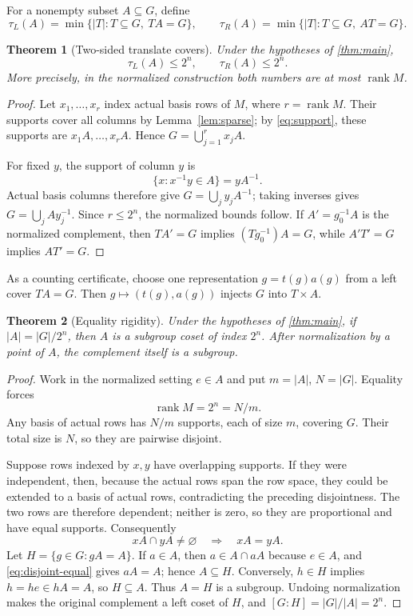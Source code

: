 \documentclass[11pt,a4paper]{amsart}
\newtheorem{theorem}{Theorem}[section]
\theoremstyle{definition}
\theoremstyle{remark}
\newcommand{\rank}{\operatorname{rank}}
\begin{document}
For a nonempty subset $A\subseteq G$, define
\[
 \tau_L(A)=\min\{|T|:T\subseteq G,\ TA=G\},\qquad
 \tau_R(A)=\min\{|T|:T\subseteq G,\ AT=G\}.
\]

\begin{theorem}[Two-sided translate covers]\label{thm:translate}
Under the hypotheses of \cref{thm:main},
\[
  \tau_L(A)\le2^n,\qquad \tau_R(A)\le2^n.
\]
More precisely, in the normalized construction both numbers are at most
$\rank M$.
\end{theorem}

\begin{proof}
Let $x_1,\ldots,x_r$ index actual basis rows of $M$, where $r=\rank M$.
Their supports cover all columns by Lemma~\ref{lem:sparse}; by
\cref{eq:support}, these supports are $x_1A,\ldots,x_rA$.  Hence
$G=\bigcup_{j=1}^r x_jA$.

For fixed $y$, the support of column $y$ is
\[
  \{x:x^{-1}y\in A\}=yA^{-1}.
\]
Actual basis columns therefore give $G=\bigcup_j y_jA^{-1}$; taking inverses
gives $G=\bigcup_j Ay_j^{-1}$.  Since $r\le2^n$, the normalized bounds follow.
If $A'=g_0^{-1}A$ is the normalized complement, then
$TA'=G$ implies $(Tg_0^{-1})A=G$, while $A'T'=G$ implies $AT'=G$.
\end{proof}

As a counting certificate, choose one representation $g=t(g)a(g)$ from a left
cover $TA=G$.  Then $g\mapsto(t(g),a(g))$ injects $G$ into $T\times A$.

\begin{theorem}[Equality rigidity]\label{thm:equality}
Under the hypotheses of \cref{thm:main}, if $|A|=|G|/2^n$, then $A$ is a
subgroup coset of index $2^n$.  After normalization by a point of $A$, the
complement itself is a subgroup.
\end{theorem}

\begin{proof}
Work in the normalized setting $e\in A$ and put $m=|A|$, $N=|G|$.  Equality
forces
\[
  \rank M=2^n=N/m.
\]
Any basis of actual rows has $N/m$ supports, each of size $m$, covering $G$.
Their total size is $N$, so they are pairwise disjoint.

Suppose rows indexed by $x,y$ have overlapping supports.  If they were
independent, then, because the actual rows span the row space, they could be
extended to a basis of actual rows, contradicting the preceding disjointness.
The two rows are therefore dependent; neither is zero, so they are proportional
and have equal supports.  Consequently
\[
  xA\cap yA\ne\varnothing\quad\Longrightarrow\quad xA=yA. \tag{4.1}\label{eq:disjoint-equal}
\]
Let $H=\{g\in G:gA=A\}$.  If $a\in A$, then $a\in A\cap aA$ because
$e\in A$, and \cref{eq:disjoint-equal} gives $aA=A$; hence $A\subseteq H$.
Conversely, $h\in H$ implies $h=he\in hA=A$, so $H\subseteq A$.  Thus
$A=H$ is a subgroup.  Undoing normalization makes the original complement a
left coset of $H$, and $[G:H]=|G|/|A|=2^n$.
\end{proof}
\end{document}

